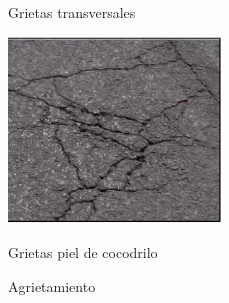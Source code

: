 \begin{figure}[ht!]
\begin{minipage}{0.3\linewidth}
		\caption*{\centering Grietas transversales }
	\end{minipage}
	\hspace{0.5 cm}
	\begin{minipage}{0.3\linewidth}
		\centering
		\includegraphics[width=\linewidth]{figs/gpc.png}
		\caption*{\centering Grietas piel de cocodrilo}
	\end{minipage}
	
	\caption{Agrietamiento}
	\label{fig:agrietamiento}
\end{figure}


